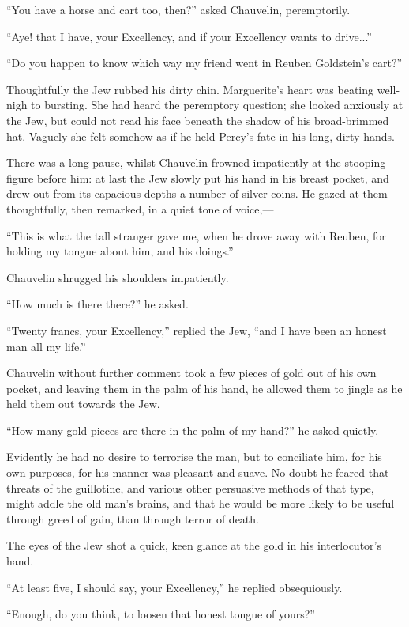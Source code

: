 \documentclass[paper=a5,BCOR=7mm,twoside,DIV=calc,12pt,usegeometry,chapterprefix,endperiod,headings=big]{scrbook}
\begin{document}
\enquote{You have a horse and cart too, then?} asked Chauvelin, peremptorily.

\enquote{Aye! that I have, your Excellency, and if your Excellency wants to drive...}

\enquote{Do you happen to know which way my friend went in Reuben Goldstein's cart?}

Thoughtfully the Jew rubbed his dirty chin. Marguerite's heart was beating well-nigh to bursting. She had heard the peremptory question; she looked anxiously at the Jew, but could not read his face beneath the shadow of his broad-brimmed hat. Vaguely she felt somehow as if he held Percy's fate in his long, dirty hands.

There was a long pause, whilst Chauvelin frowned impatiently at the stooping figure before him: at last the Jew slowly put his hand in his breast pocket, and drew out from its capacious depths a number of silver coins. He gazed at them thoughtfully, then remarked, in a quiet tone of voice,---

\enquote{This is what the tall stranger gave me, when he drove away with Reuben, for holding my tongue about him, and his doings.}

Chauvelin shrugged his shoulders impatiently.

\enquote{How much is there there?} he asked.

\enquote{Twenty francs, your Excellency,} replied the Jew, \enquote{and I have been an honest man all my life.}

Chauvelin without further comment took a few pieces of gold out of his own pocket, and leaving them in the palm of his hand, he allowed them to jingle as he held them out towards the Jew.

\enquote{How many gold pieces are there in the palm of my hand?} he asked quietly.

Evidently he had no desire to terrorise the man, but to conciliate him, for his own purposes, for his manner was pleasant and suave. No doubt he feared that threats of the guillotine, and various other persuasive methods of that type, might addle the old man's brains, and that he would be more likely to be useful through greed of gain, than through terror of death.

The eyes of the Jew shot a quick, keen glance at the gold in his interlocutor's hand.

\enquote{At least five, I should say, your Excellency,} he replied obsequiously.

\enquote{Enough, do you think, to loosen that honest tongue of yours?}
\end{document}

